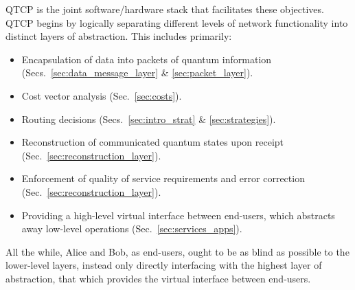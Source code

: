 QTCP is the joint software/hardware stack that facilitates these objectives. QTCP begins by logically separating different levels of network functionality into distinct layers of abstraction. This includes primarily:
\begin{itemize}
	\item Encapsulation of data into packets of quantum information (Secs.~\ref{sec:data_message_layer} \& \ref{sec:packet_layer}).
	\item Cost vector analysis (Sec.~\ref{sec:costs}).
	\item Routing decisions (Secs.~\ref{sec:intro_strat} \& \ref{sec:strategies}).
	\item Reconstruction of communicated quantum states upon receipt (Sec.~\ref{sec:reconstruction_layer}).
	\item Enforcement of quality of service requirements and error correction (Sec.~\ref{sec:reconstruction_layer}).
	\item Providing a high-level virtual interface between end-users, which abstracts away low-level operations (Sec.~\ref{sec:services_apps}).
\end{itemize}

All the while, Alice and Bob, as end-users, ought to be as blind as possible to the lower-level layers, instead only directly interfacing with the highest layer of abstraction, that which provides the virtual interface between end-users.